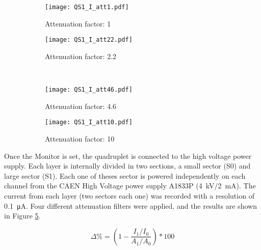 	\begin{figure}[ht]
			\hspace*{\fill}
			\begin{subfigure}[b]{0.45\textwidth}
				\centering
				\texttt{[image: QS1\_I\_att1.pdf]}
				\caption{Attenuation factor: 1}\label{fig:att1}
			\end{subfigure}
			\hfill
			\begin{subfigure}[b]{0.45\textwidth}
				\centering
				\texttt{[image: QS1\_I\_att22.pdf]}
				\caption{Attenuation factor: 2.2}\label{fig:att22}
			\end{subfigure}
			\hspace*{\fill}\\
			\hspace*{\fill}
			\begin{subfigure}[b]{0.45\textwidth}
				\centering
				\texttt{[image: QS1\_I\_att46.pdf]}
				\caption{Attenuation factor: 4.6}\label{fig:att46}
			\end{subfigure}
			\hfill
			\begin{subfigure}[b]{0.45\textwidth}
				\centering
				\texttt{[image: QS1\_I\_att10.pdf]}
				\caption{Attenuation factor: 10}\label{fig:att10}
			\end{subfigure}
			\hspace*{\fill}
			\caption{}\label{gifresult}
	\end{figure}

	Once the Monitor is set, the quadruplet is connected to the high voltage power supply. Each layer is internally divided
	in two sections, a small sector (S0) and large sector (S1). Each one of theses sector is powered independently on each
	channel from the CAEN High Voltage power supply A1833P (\SI{4}{kV}/\SI{2}{mA}). The current from each layer (two
	sectors each one)	was recorded with a resolution of \SI{0.1}{\micro A}. Four different attenuation filters were applied, and the results are shown in Figure
	\ref{gifresult}. \par
\begin{equation}\label{eqn:delta}
\Delta\%=\left(1-\frac{I_1/I_0}{A_1/A_0}\right)*100
\end{equation}


